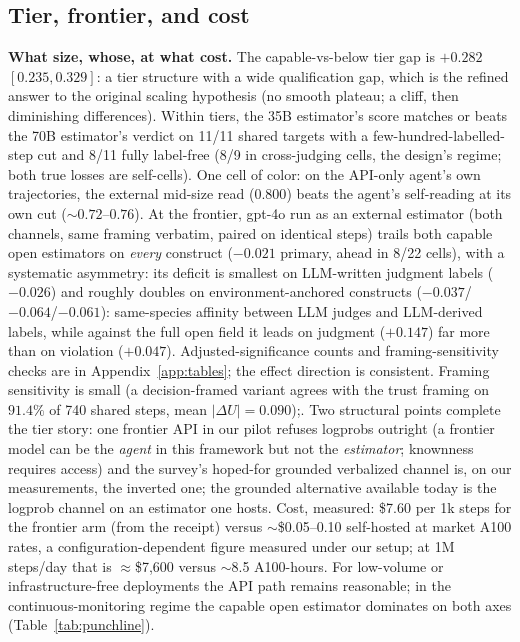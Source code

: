 \documentclass{article}
\begin{document}
\subsection{Tier, frontier, and cost}
\textbf{What size, whose, at what cost.} The capable-vs-below tier gap is
$+0.282$ $[0.235, 0.329]$: a tier structure with a wide qualification gap,
which is the refined answer to the original scaling hypothesis (no smooth
plateau; a cliff, then diminishing differences). Within tiers, the 35B
estimator's score matches or beats the 70B estimator's verdict on 11/11 shared
targets with a few-hundred-labelled-step cut and 8/11 fully label-free (8/9 in
cross-judging cells, the design's regime; both true losses are self-cells).
One cell of color: on the API-only agent's own trajectories, the external
mid-size read ($0.800$) beats the agent's self-reading at its own cut
($\sim$$0.72$--$0.76$). At the frontier, gpt-4o run as an external estimator
(both channels, same framing verbatim, paired on identical steps) trails both capable open estimators on \emph{every} construct ($-0.021$ primary,
ahead in 8/22 cells), with a systematic asymmetry: its deficit is
smallest on LLM-written judgment labels ($-0.026$) and roughly doubles on
environment-anchored constructs ($-0.037$/$-0.064$/$-0.061$): same-species
affinity between LLM judges and LLM-derived labels, while against the full
open field it leads on judgment ($+0.147$) far more than on violation
($+0.047$). Adjusted-significance counts and framing-sensitivity checks are in
Appendix~\ref{app:tables}; the effect direction is consistent. Framing
sensitivity is small (a decision-framed variant agrees
with the trust framing on $91.4\%$ of 740 shared steps, mean
$|\Delta U| = 0.090$);. Two structural points complete the tier story: one
frontier API in our pilot refuses logprobs outright (a frontier model can be
the \emph{agent} in this framework but not the \emph{estimator}; knownness
requires access) and the survey's hoped-for grounded verbalized channel is,
on our measurements, the inverted one; the grounded alternative available
today is the logprob channel on an estimator one hosts. Cost, measured:
\$7.60 per 1k steps for the frontier arm (from the receipt) versus
$\sim$\$0.05--0.10 self-hosted at market A100 rates, a configuration-dependent
figure measured under our setup; at 1M steps/day that is
$\approx$\$7{,}600 versus $\sim$8.5 A100-hours. For low-volume or
infrastructure-free deployments the API path remains reasonable; in the
continuous-monitoring regime the capable open estimator dominates on both
axes (Table~\ref{tab:punchline}).
\end{document}
